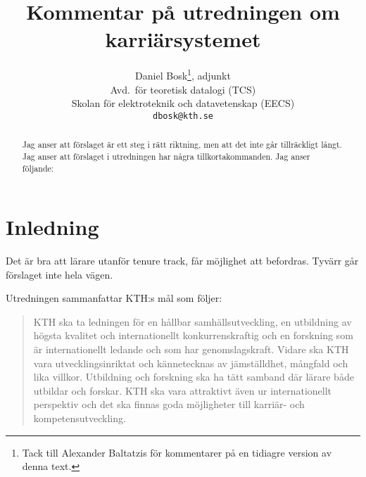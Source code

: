 \documentclass[a4paper,oneside,article,swedish]{memoir}
\title{Kommentar på utredningen om karriärsystemet}
\author{%
  Daniel Bosk\thanks{%
    Tack till Alexander Baltatzis för kommentarer på en tidiagre version av
    denna text.
  }, adjunkt\\
  Avd.~för teoretisk datalogi (TCS)\\
  Skolan för elektroteknik och datavetenskap (EECS)\\
  \texttt{dbosk@kth.se}
}
\let\section\chapter
\begin{document}
\maketitle
\begin{abstract}
  Jag anser att förslaget är ett steg i rätt riktning, men att det inte går 
  tillräckligt långt.
  Jag anser att förslaget i utredningen har några tillkortakommanden.
  Jag anser följande:
  
\end{abstract}
\clearpage
\tableofcontents*
\clearpage


\section{Inledning}

Det är bra att lärare utanför tenure track, får möjlighet att befordras.
Tyvärr går förslaget inte hela vägen.

Utredningen\autocite{utredning} sammanfattar KTH:s mål som följer:
\blockcquote[s.~2]{utredning}{%
  KTH ska ta ledningen för en hållbar samhällsutveckling, en utbildning av 
  högsta kvalitet och internationellt konkurrenskraftig och en forskning som 
  är internationellt ledande och som har genomslagskraft.
  Vidare ska KTH vara utvecklingsinriktat och kännetecknas av jämställdhet, 
  mångfald och lika villkor.
  Utbildning och forskning ska ha tätt samband där lärare både utbildar och 
  forskar.
  KTH ska vara attraktivt även ur internationellt perspektiv och det ska 
  finnas goda möjligheter till karriär- och kompetensutveckling.%
}
\end{document}
